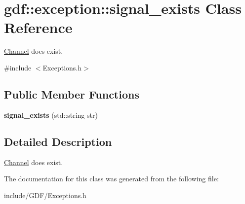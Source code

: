 \hypertarget{classgdf_1_1exception_1_1signal__exists}{
\section{gdf::exception::signal\_\-exists Class Reference}
\label{classgdf_1_1exception_1_1signal__exists}
}


\hyperlink{classgdf_1_1_channel}{Channel} does exist.  




{\ttfamily \#include $<$Exceptions.h$>$}

\subsection*{Public Member Functions}
\begin{DoxyCompactItemize}
\item 
\hypertarget{classgdf_1_1exception_1_1signal__exists_a80bf174a9953309cddce10454d6abafb}{
{\bfseries signal\_\-exists} (std::string str)}
\label{classgdf_1_1exception_1_1signal__exists_a80bf174a9953309cddce10454d6abafb}

\end{DoxyCompactItemize}


\subsection{Detailed Description}
\hyperlink{classgdf_1_1_channel}{Channel} does exist. 

The documentation for this class was generated from the following file:\begin{DoxyCompactItemize}
\item 
include/GDF/Exceptions.h\end{DoxyCompactItemize}
